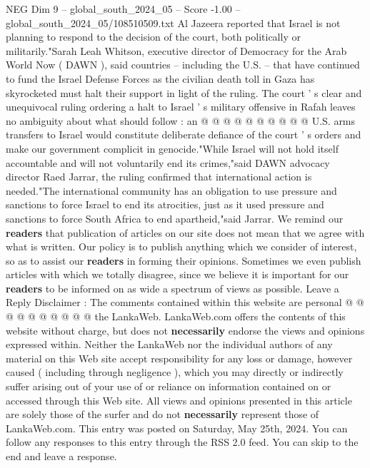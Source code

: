 \begin{textsample}{NEG Dim 9 – global\_south\_2024\_05 – Score -1.00 – global\_south\_2024\_05/108510509.txt}
Al Jazeera reported that Israel is not planning to respond to the decision of the court, both politically or militarily."Sarah Leah Whitson, executive director of Democracy for the Arab World Now ( DAWN ), said countries -- including the U.S. -- that have continued to fund the Israel Defense Forces as the civilian death toll in Gaza has skyrocketed must halt their support in light of the ruling.
The court ' s clear and unequivocal ruling ordering a halt to Israel ' s military offensive in Rafah leaves no ambiguity about what should follow : an @ @ @ @ @ @ @ @ @ @ U.S. arms transfers to Israel would constitute deliberate defiance of the court ' s orders and make our government complicit in genocide."While Israel will not hold itself accountable and will not voluntarily end its crimes,"said DAWN advocacy director Raed Jarrar, the ruling confirmed that international action is needed."The international community has an obligation to use pressure and sanctions to force Israel to end its atrocities, just as it used pressure and sanctions to force South Africa to end apartheid,"said Jarrar.
We remind our \textbf{readers} that publication of articles on our site does not mean that we agree with what is written.
Our policy is to publish anything which we consider of interest, so as to assist our \textbf{readers} in forming their opinions.
Sometimes we even publish articles with which we totally disagree, since we believe it is important for our \textbf{readers} to be informed on as wide a spectrum of views as possible.
Leave a Reply Disclaimer : The comments contained within this website are personal @ @ @ @ @ @ @ @ @ @ the LankaWeb.
LankaWeb.com offers the contents of this website without charge, but does not \textbf{necessarily} endorse the views and opinions expressed within.
Neither the LankaWeb nor the individual authors of any material on this Web site accept responsibility for any loss or damage, however caused ( including through negligence ), which you may directly or indirectly suffer arising out of your use of or reliance on information contained on or accessed through this Web site.
All views and opinions presented in this article are solely those of the surfer and do not \textbf{necessarily} represent those of LankaWeb.com.
This entry was posted on Saturday, May 25th, 2024.
You can follow any responses to this entry through the RSS 2.0 feed.
You can skip to the end and leave a response.

\end{textsample}
